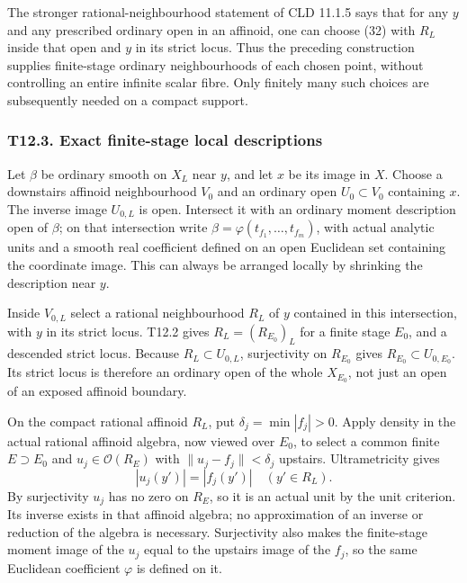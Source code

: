 \documentclass[
  10pt,
]{article}
\begin{document}
The stronger rational-neighbourhood statement of CLD 11.1.5 says that
for any \(y\) and any prescribed ordinary open in an affinoid, one can
choose (32) with \(R_L\) inside that open and \(y\) in its strict locus.
Thus the preceding construction supplies finite-stage ordinary
neighbourhoods of each chosen point, without controlling an entire
infinite scalar fibre. Only finitely many such choices are subsequently
needed on a compact support.

\subsubsection{T12.3. Exact finite-stage local
descriptions}\label{t12.3.-exact-finite-stage-local-descriptions}

Let \(\beta\) be ordinary smooth on \(X_L\) near \(y\), and let \(x\) be
its image in \(X\). Choose a downstairs affinoid neighbourhood \(V_0\)
and an ordinary open \(U_0\subset V_0\) containing \(x\). The inverse
image \(U_{0,L}\) is open. Intersect it with an ordinary moment
description open of \(\beta\); on that intersection write
\(\beta=\varphi(t_{f_1},\ldots,t_{f_m})\), with actual analytic units
and a smooth real coefficient defined on an open Euclidean set
containing the coordinate image. This can always be arranged locally by
shrinking the description near \(y\).

Inside \(V_{0,L}\) select a rational neighbourhood \(R_L\) of \(y\)
contained in this intersection, with \(y\) in its strict locus. T12.2
gives \(R_L=(R_{E_0})_L\) for a finite stage \(E_0\), and a descended
strict locus. Because \(R_L\subset U_{0,L}\), surjectivity on
\(R_{E_0}\) gives \(R_{E_0}\subset U_{0,E_0}\). Its strict locus is
therefore an ordinary open of the whole \(X_{E_0}\), not just an open of
an exposed affinoid boundary.

On the compact rational affinoid \(R_L\), put \(\delta_j=\min|f_j|>0\).
Apply density in the actual rational affinoid algebra, now viewed over
\(E_0\), to select a common finite \(E\supset E_0\) and
\(u_j\in\mathcal O(R_E)\) with \(\|u_j-f_j\|<\delta_j\) upstairs.
Ultrametricity gives \[
                     |u_j(y')|=|f_j(y')|
                                 \quad(y'\in R_L).     \tag{35}
\] By surjectivity \(u_j\) has no zero on \(R_E\), so it is an actual
unit by the unit criterion. Its inverse exists in that affinoid algebra;
no approximation of an inverse or reduction of the algebra is necessary.
Surjectivity also makes the finite-stage moment image of the \(u_j\)
equal to the upstairs image of the \(f_j\), so the same Euclidean
coefficient \(\varphi\) is defined on it.
\end{document}
